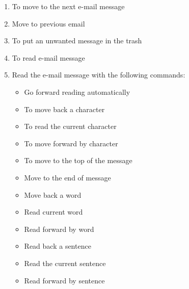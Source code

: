\documentclass[10pt,letterpaper,twoside]{report}
\begin{document}
{{{\begin{enumerate}
\begin{itemize}
\begin{itemize}
	            \item etc
	        \end{itemize}
	    \end{itemize}
	\item To move to the next e-mail message  
	\item Move to previous email 
	\item To put an unwanted message in the trash  
	\item To read e-mail message  
	\item Read the e-mail message with the following commands:
	      \begin{itemize}
		      \item Go forward reading automatically 
		      \item To move back a character  
		      \item To read the current character  
		      \item To move forward by character 
		      \item To move to the top of the message   
		      \item Move to the end of message  
		      \item Move back a word  
		      \item Read current word    
		      \item Read forward by word  
		      \item Read back a sentence  
		      \item Read the current sentence   
		      \item Read forward by sentence  

\end{itemize}
\end{enumerate}}}}
\end{document}
